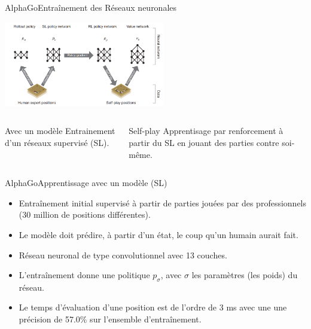 \begin{frame}{AlphaGo}{Entraînement des Réseaux neuronales}
	\begin{center}
		\includegraphics[width=7cm]{ressources/Entrainement}
		\begin{columns}[t]
			\begin{column}{.4\textwidth}
				\begin{block}{Avec un modèle}
					Entrainement d'un réseaux supervisé (SL).
				\end{block}
			\end{column}
			\begin{column}{.4\textwidth}
				\begin{block}{Self-play}
					Apprentisage par renforcement à partir du SL en jouant des parties contre soi-même.
				\end{block}
			\end{column}
		\end{columns}

	\end{center}

\end{frame}


\begin{frame}{AlphaGo}{Apprentissage avec un modèle (SL)}

	\begin{itemize}
		\item Entraînement initial supervisé à partir de parties jouées par des professionnels (30 million de positions différentes).
		\item Le modèle doit prédire, à partir d'un état, le coup qu'un humain aurait fait.
		\item Réseau neuronal de type convolutionnel avec 13 couches.
		\item L’entraînement donne une politique $p_\sigma$, avec $\sigma$ les paramètres (les poids) du réseau.
		\item Le temps d'évaluation d'une position est de l'ordre de 3 ms avec une une précision de 57.0\% sur l'ensemble d’entraînement.
	\end{itemize}

\end{frame}


